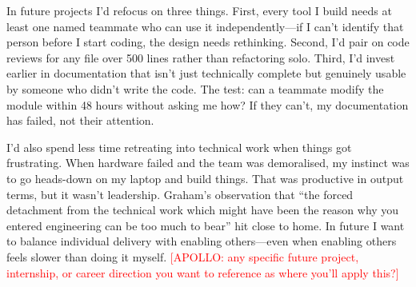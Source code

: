 In future projects I'd refocus on three things. First, every tool I build needs at least one named teammate who can use it independently---if I can't identify that person before I start coding, the design needs rethinking. Second, I'd pair on code reviews for any file over 500 lines rather than refactoring solo. Third, I'd invest earlier in documentation that isn't just technically complete but genuinely usable by someone who didn't write the code. The test: can a teammate modify the module within 48 hours without asking me how? If they can't, my documentation has failed, not their attention.

I'd also spend less time retreating into technical work when things got frustrating. When hardware failed and the team was demoralised, my instinct was to go heads-down on my laptop and build things. That was productive in output terms, but it wasn't leadership. Graham's observation that ``the forced detachment from the technical work which might have been the reason why you entered engineering can be too much to bear'' hit close to home. In future I want to balance individual delivery with enabling others---even when enabling others feels slower than doing it myself. \textcolor{red}{[APOLLO: any specific future project, internship, or career direction you want to reference as where you'll apply this?]}
